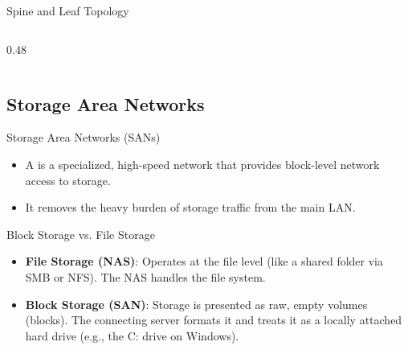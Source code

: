 \documentclass[aspectratio=169]{beamer}  %
\begin{document}
\begin{frame}[t]{Spine and Leaf Topology}
\begin{columns}[T]
\begin{column}{0.48\textwidth}
\begin{center}
            \end{center}
        \end{column}
    \end{columns}
\end{frame}

\subsection{Storage Area Networks}
\begin{frame}[t]{Storage Area Networks (SANs)}
    \begin{itemize}
        \item A  is a specialized, high-speed network that provides block-level network access to storage.
        \item It removes the heavy burden of storage traffic from the main LAN.
    \end{itemize}
    \vspace{0.3em}
    \begin{block}{Block Storage vs. File Storage}
        \begin{itemize}
            \footnotesize
            \item \textbf{File Storage (NAS)}: Operates at the file level (like a shared folder via SMB or NFS). The NAS handles the file system.
            \item \textbf{Block Storage (SAN)}: Storage is presented as raw, empty volumes (blocks). The connecting server formats it and treats it as a locally attached hard drive (e.g., the C: drive on Windows).
        \end{itemize}
    \end{block}
\end{frame}
\end{document}
